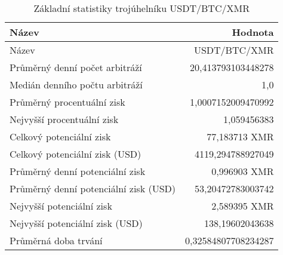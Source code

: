 \begin{table}\centering
\caption{Základní statistiky trojúhelníku USDT/BTC/XMR}
\label{USDTBTCXMR_stats}
\begin{tabular}{|| l | r ||}
\hline Název & Hodnota \\ 
\hline\hline Název & USDT/BTC/XMR \\ 
\hline Průměrný denní počet arbitráží & 20,413793103448278 \\ 
\hline Medián denního počtu arbitráží & 1,0 \\ 
\hline Průměrný procentuální zisk & 1,0007152009470992 \\ 
\hline Nejvyšší procentuální zisk & 1,059456383 \\ 
\hline Celkový potenciální zisk & 77,183713 XMR \\ 
\hline Celkový potenciální zisk (USD) & 4119,294788927049 \\ 
\hline Průměrný denní potenciální zisk & 0,996903 XMR \\ 
\hline Průměrný denní potenciální zisk (USD) & 53,20472783003742 \\ 
\hline Nejvyšší potenciální zisk & 2,589395 XMR \\ 
\hline Nejvyšší potenciální zisk (USD) & 138,19602043638 \\ 
\hline Průměrná doba trvání & 0,32584807708234287 \\ 
\hline
\end{tabular}
\end{table}